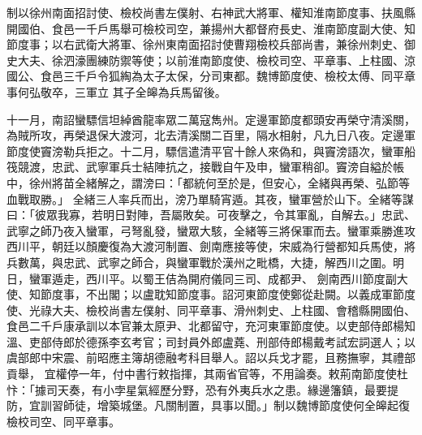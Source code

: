 \begin{pinyinscope}
 制以徐州南面招討使、檢校尚書左僕射、右神武大將軍、權知淮南節度事、扶風縣開國伯、食邑一千戶馬舉可檢校司空，兼揚州大都督府長史、淮南節度副大使、知節度事；以右武衛大將軍、徐州東南面招討使曹翔檢校兵部尚書，兼徐州刺史、御史大夫、徐泗濠團練防禦等使；以前淮南節度使、檢校司空、平章事、上柱國、涼國公、食邑三千戶令狐綯為太子太保，分司東都。魏博節度使、檢校太傅、同平章事何弘敬卒，三軍立
 其子全皞為兵馬留後。



 十一月，南詔蠻驃信坦綽酋龍率眾二萬寇雋州。定邊軍節度都頭安再榮守清溪關，為賊所攻，再榮退保大渡河，北去清溪關二百里，隔水相射，凡九日八夜。定邊軍節度使竇滂勒兵拒之。十二月，驃信遣清平官十餘人來偽和，與竇滂語次，蠻軍船筏競渡，忠武、武寧軍兵士結陣抗之，接戰自午及申，蠻軍稍卻。竇滂自縊於帳中，徐州將苗全緒解之，謂滂曰：「都統何至於是，但安心，全緒與再榮、弘節等血戰取勝。」
 全緒三人率兵而出，滂乃單騎宵遁。其夜，蠻軍營於山下。全緒等謀曰：「彼眾我寡，若明日對陣，吾屬敗矣。可夜擊之，令其軍亂，自解去。」忠武、武寧之師乃夜入蠻軍，弓弩亂發，蠻眾大駭，全緒等三將保軍而去。蠻軍乘勝進攻西川平，朝廷以顏慶復為大渡河制置、劍南應接等使，宋威為行營都知兵馬使，將兵數萬，與忠武、武寧之師合，與蠻軍戰於漢州之毗橋，大捷，解西川之圍。明日，蠻軍遁走，西川平。以蜀王佶為開府儀同三司、成都尹、
 劍南西川節度副大使、知節度事，不出閣；以盧耽知節度事。詔河東節度使鄭從赴闕。以義成軍節度使、光祿大夫、檢校尚書左僕射、同平章事、滑州刺史、上柱國、會稽縣開國伯、食邑二千戶康承訓以本官兼太原尹、北都留守，充河東軍節度使。以吏部侍郎楊知溫、吏部侍郎於德孫李玄考官；司封員外郎盧蕘、刑部侍郎楊戴考試宏詞選人；以虞部郎中宋震、前昭應主簿胡德融考科目舉人。詔以兵戈才罷，且務撫寧，其禮部貢舉，
 宜權停一年，付中書行敕指揮，其兩省官等，不用論奏。敕荊南節度使杜忭：「據司天奏，有小孛星氣經歷分野，恐有外夷兵水之患。緣邊籓鎮，最要提防，宜訓習師徒，增築城堡。凡關制置，具事以聞。」制以魏博節度使何全皞起復檢校司空、同平章事。




\end{pinyinscope}
